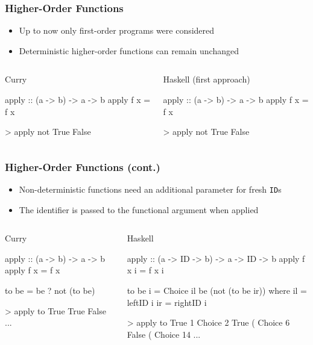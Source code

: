 \documentclass[utf8]{beamer}
\newenvironment{program}{\begin{semiverbatim}\small}{\end{semiverbatim}}
\begin{document}
\begin{frame}[fragile]
\frametitle{Higher-Order Functions}
\begin{itemize}
\item Up to now only first-order programs were considered
\item Deterministic higher-order functions can remain unchanged
\end{itemize}
\begin{columns}
\begin{block}{Curry}
\begin{program}
apply :: (a -> b) -> a -> b
apply f x = f x

> apply not True
False
\end{program}
\end{block}
\begin{block}{Haskell (first approach)}
\begin{program}
apply :: (a -> b) -> a -> b
apply f x = f x

> apply not True
False
\end{program}
\end{block}
\end{columns}
\end{frame}


\begin{frame}[fragile]
\frametitle{Higher-Order Functions (cont.)}
\begin{itemize}
\item Non-deterministic functions need an additional parameter for fresh \verb!ID!s
\item The identifier is passed to the functional argument when applied
\end{itemize}
\begin{columns}[t]
\begin{block}{Curry}
\begin{program}
apply :: (a -> b) 
      -> a -> b
apply f x = f x

to be = be ? not (to be)

> apply to True
True
False
...
\end{program}
\end{block}
\begin{block}{Haskell}
\begin{program}
apply :: (a -> ID -> b) 
      -> a -> ID -> b
apply f x i = f x i

to be i = 
  Choice il be (not (to be ir))
  where il = leftID  i
        ir = rightID i

> apply to True 1
Choice 2 True (
Choice 6 False (
Choice 14 ...
\end{program}
\end{block}
\end{columns}
\end{frame}
\end{document}
